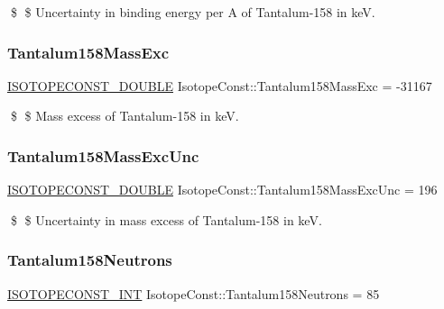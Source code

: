 \$ \$ Uncertainty in binding energy per A of Tantalum-\/158 in keV. \mbox{\label{group___isotope_const-_tantalum-_ta158_ga01cdfd4e406c81f427d5920b5fdc291d}} 
\subsubsection{\texorpdfstring{Tantalum158\+Mass\+Exc}{Tantalum158MassExc}}
{\footnotesize\ttfamily \mbox{\hyperlink{group___isotope_const-_macros_ga8f45a7272ce02c0b4c65c44636ed719a}{I\+S\+O\+T\+O\+P\+E\+C\+O\+N\+S\+T\+\_\+\+D\+O\+U\+B\+LE}} Isotope\+Const\+::\+Tantalum158\+Mass\+Exc = -\/31167}

\$ \$ Mass excess of Tantalum-\/158 in keV. \mbox{\label{group___isotope_const-_tantalum-_ta158_gae23248ab937bcd84394117fc27072b7e}} 
\subsubsection{\texorpdfstring{Tantalum158\+Mass\+Exc\+Unc}{Tantalum158MassExcUnc}}
{\footnotesize\ttfamily \mbox{\hyperlink{group___isotope_const-_macros_ga8f45a7272ce02c0b4c65c44636ed719a}{I\+S\+O\+T\+O\+P\+E\+C\+O\+N\+S\+T\+\_\+\+D\+O\+U\+B\+LE}} Isotope\+Const\+::\+Tantalum158\+Mass\+Exc\+Unc = 196}

\$ \$ Uncertainty in mass excess of Tantalum-\/158 in keV. \mbox{\label{group___isotope_const-_tantalum-_ta158_gad5dad966d251e11e4929a71a48b0e3a7}} 
\subsubsection{\texorpdfstring{Tantalum158\+Neutrons}{Tantalum158Neutrons}}
{\footnotesize\ttfamily \mbox{\hyperlink{group___isotope_const-_macros_ga5f18360b3e99483a35c32d789e62621c}{I\+S\+O\+T\+O\+P\+E\+C\+O\+N\+S\+T\+\_\+\+I\+NT}} Isotope\+Const\+::\+Tantalum158\+Neutrons = 85}

